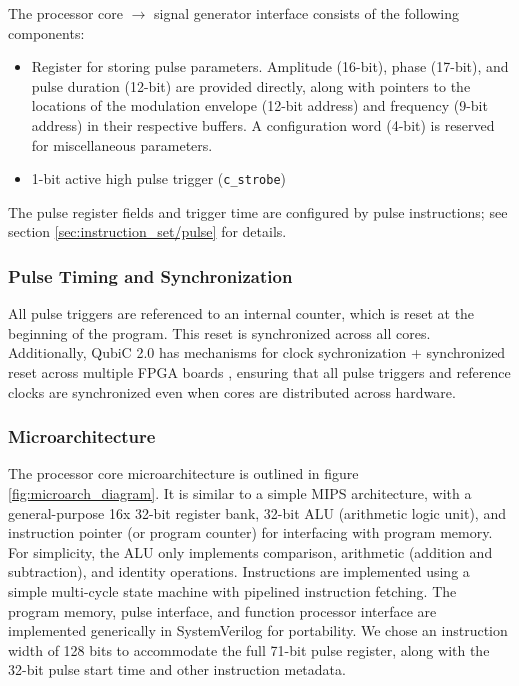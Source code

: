 \documentclass[journal]{IEEEtran}
\begin{document}
The processor core $\rightarrow$ signal generator interface consists of the following components: 
\begin{itemize}
    \item Register for storing pulse parameters. Amplitude (16-bit), phase (17-bit), and pulse duration (12-bit) are provided directly, along with pointers to the locations of the modulation envelope (12-bit address) and frequency (9-bit address) in their respective buffers. A configuration word (4-bit) is reserved for miscellaneous parameters.
    \item 1-bit active high pulse trigger (\verb|c_strobe|)
\end{itemize}

The pulse register fields and trigger time are configured by pulse instructions; see section \ref{sec:instruction_set/pulse} for details. 

\subsubsection{Pulse Timing and Synchronization}

All pulse triggers are referenced to an internal counter, which is reset at the beginning of the program. This reset is synchronized across all cores. Additionally, QubiC 2.0 has mechanisms for clock sychronization + synchronized reset across multiple FPGA boards \cite{qubic2}, ensuring that all pulse triggers and reference clocks are synchronized even when cores are distributed across hardware.

\subsubsection{Microarchitecture}
\label{sec:microarch}

The processor core microarchitecture is outlined in figure \ref{fig:microarch_diagram}. It is similar to a simple MIPS \cite{kane1992mips} architecture, with a general-purpose 16x 32-bit register bank, 32-bit ALU (arithmetic logic unit), and instruction pointer (or program counter) for interfacing with program memory. For simplicity, the ALU only implements comparison, arithmetic (addition and subtraction), and identity operations. Instructions are implemented using a simple multi-cycle state machine with pipelined instruction fetching. The program memory, pulse interface, and function processor interface are implemented generically in SystemVerilog for portability. We chose an instruction width of 128 bits to accommodate the full 71-bit pulse register, along with the 32-bit pulse start time and other instruction metadata.
\end{document}
